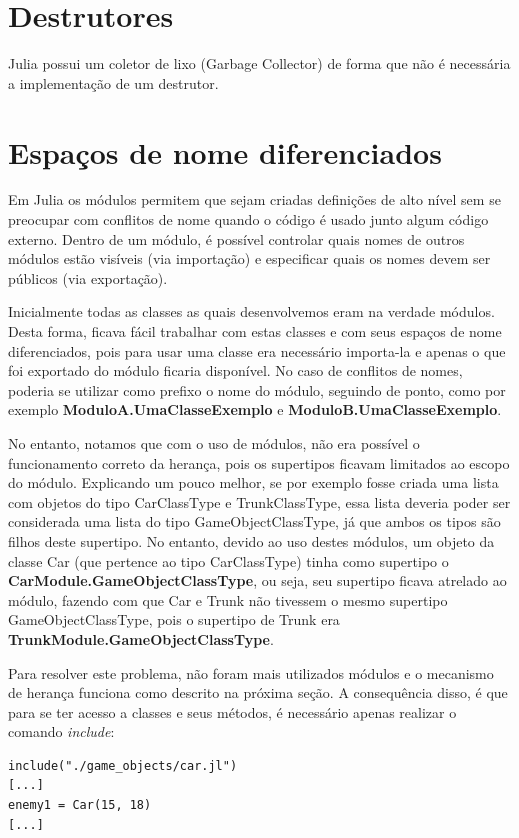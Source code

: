 \documentclass[rel_mlp]{iiufrgs}
\begin{document}
\section{Destrutores}

Julia possui um coletor de lixo (Garbage Collector) de forma que não é necessária a implementação de um destrutor.

\section{Espaços de nome diferenciados}


Em Julia os módulos permitem que sejam criadas definições de alto nível sem se preocupar com conflitos de nome quando o código é usado junto algum código externo. Dentro de um módulo, é possível controlar quais nomes de outros módulos estão visíveis (via importação) e especificar quais os nomes devem ser públicos (via exportação). 

Inicialmente todas as classes as quais desenvolvemos eram na verdade módulos. Desta forma, ficava fácil trabalhar com estas classes e com seus espaços de nome diferenciados, pois para usar uma classe era necessário importa-la e apenas o que foi exportado do módulo ficaria disponível. No caso de conflitos de nomes, poderia se utilizar como prefixo o nome do módulo, seguindo de ponto, como por exemplo \textbf{ModuloA.UmaClasseExemplo} e \textbf{ModuloB.UmaClasseExemplo}.

No entanto, notamos que com o uso de módulos, não era possível o funcionamento correto da herança, pois os supertipos ficavam limitados ao escopo do módulo. Explicando um pouco melhor, se por exemplo fosse criada uma lista com objetos do tipo CarClassType e TrunkClassType, essa lista deveria poder ser considerada uma lista do tipo GameObjectClassType, já que ambos os tipos são filhos deste supertipo. No entanto, devido ao uso destes módulos, um objeto da classe Car (que pertence ao tipo CarClassType)  tinha como supertipo o \textbf{CarModule.GameObjectClassType}, ou seja, seu supertipo ficava atrelado ao módulo, fazendo com que Car e Trunk não tivessem o mesmo supertipo GameObjectClassType, pois o supertipo de Trunk era \textbf{TrunkModule.GameObjectClassType}.

Para resolver este problema, não foram mais utilizados módulos e o mecanismo de herança funciona como descrito na próxima seção. A consequência disso, é que para se ter acesso a classes e seus métodos, é necessário apenas realizar o comando \textit{include}:
\begin{lstlisting}[frame=single]
include("./game_objects/car.jl")
[...]
enemy1 = Car(15, 18)
[...]
\end{lstlisting}
\end{document}

